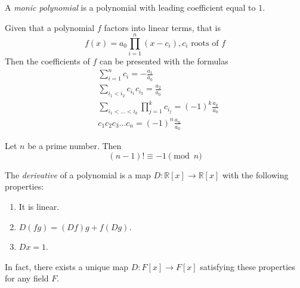 \documentclass{article}
\begin{document}
      \begin{definition}
        A \textit{monic polynomial} is a polynomial with leading coefficient equal to $1$. 
      \end{definition}

      \begin{theorem}
        Given that a polynomial $f$ factors into linear terms, that is 
        \[f(x) = a_0 \prod_{i = 1}^{n} (x - c_i), c_i \text{ roots of } f\]
        Then the coefficients of $f$ can be presented with the formulas
        \begin{align*}
          & \sum_{i=1}^n c_i = - \frac{a_1}{a_0} \\
          & \sum_{i_1 < i_2} c_{i_1} c_{i_2} = \frac{a_2}{a_0} \\
          & \sum_{i_1< ...< i_k} \prod_{j = 1}^{k} c_{i_j} = (-1)^k \frac{a_k}{a_0} \\
          & c_1 c_2 c_3 ... c_n = (-1)^n \frac{a_n}{a_0}
        \end{align*}
      \end{theorem}

      \begin{theorem}
        Let $n$ be a prime number. Then 
        \begin{equation}
          (n-1)! \equiv -1 \pmod{n}
        \end{equation}
      \end{theorem}

      \begin{definition}
        The \textit{derivative} of a polynomial is a map $D: \mathbb{R}[x] \longrightarrow \mathbb{R}[x]$ with the following properties:
        \begin{enumerate}
          \item It is linear. 
          \item $D(f g) = (D f) g + f (D g)$. 
          \item $D x = 1$. 
        \end{enumerate}
      \end{definition}

      In fact, there exists a unique map $D: F[x] \longrightarrow F[x]$ satisfying these properties for any field $F$. 
\end{document}
